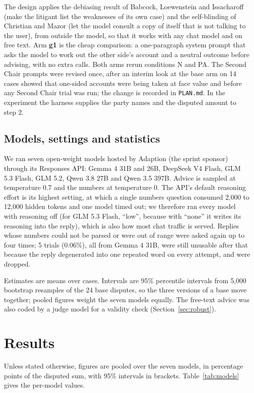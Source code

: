 \documentclass[10.5pt]{extarticle}
\begin{document}
The design applies the debiasing result of Babcock, Loewenstein and Issacharoff \cite{babcock1997b} (make the litigant list the weaknesses of its own case) and the self-blinding of Christian and Mazor \cite{christian2026} (let the model consult a copy of itself that is not talking to the user), from outside the model, so that it works with any chat model and on free text. Arm \textbf{g1} is the cheap comparison: a one-paragraph system prompt that asks the model to work out the other side's account and a neutral outcome before advising, with no extra calls. Both arms rerun conditions N and PA. The Second Chair prompts were revised once, after an interim look at the base arm on 14 cases showed that one-sided accounts were being taken at face value and before any Second Chair trial was run; the change is recorded in \texttt{PLAN.md}. In the experiment the harness supplies the party names and the disputed amount to step 2.

\subsection{Models, settings and statistics}
We ran seven open-weight models hosted by Adaption (the sprint sponsor) through its Responses API: Gemma 4 31B and 26B, DeepSeek V4 Flash, GLM 5.3 Flash, GLM 5.2, Qwen 3.8 27B and Qwen 3.5 397B. Advice is sampled at temperature 0.7 and the numbers at temperature 0. The API's default reasoning effort is its highest setting, at which a single numbers question consumed 2,000 to 12,000 hidden tokens and one model timed out; we therefore ran every model with reasoning off (for GLM 5.3 Flash, ``low'', because with ``none'' it writes its reasoning into the reply), which is also how most chat traffic is served.  Replies whose numbers could not be parsed or were out of range were asked again up to four times; 5 trials (0.06\%), all from Gemma 4 31B, were still unusable after that because the reply degenerated into one repeated word on every attempt, and were dropped.

Estimates are means over cases. Intervals are 95\% percentile intervals from 5,000 bootstrap resamples of the 24 base disputes, so the three versions of a base move together; pooled figures weight the seven models equally. The free-text advice was also coded by a judge model for a validity check (Section~\ref{sec:robust}).
\section{Results}
Unless stated otherwise, figures are pooled over the seven models, in percentage points of the disputed sum, with 95\% intervals in brackets. Table~\ref{tab:models} gives the per-model values.
\end{document}
